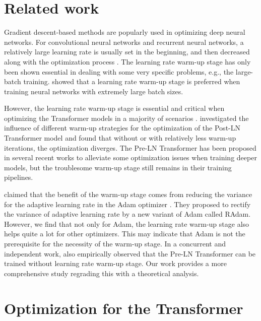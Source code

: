 \documentclass{article}
\begin{document}
\section{Related work}
Gradient descent-based methods \citep{kingma2014adam, zeiler2012adadelta, duchi2011adaptive,tieleman2012lecture} are popularly used in optimizing deep neural networks. For convolutional neural networks and recurrent neural networks, a relatively large learning rate is usually set in the beginning, and then decreased along with the optimization process \citep{he2016deep,he2017mask, sutskever2014sequence,gehring2017convolutional,he2019bag}. The learning rate warm-up stage has only been shown essential in dealing with some very specific problems, e.g., the large-batch training. \citet{goyal2017accurate,he2019bag,you2018imagenet} showed that a learning rate warm-up stage is preferred when training neural networks with extremely large batch sizes.

However, the learning rate warm-up stage is essential and critical when optimizing the Transformer models in a majority of scenarios \citep{vaswani2017attention, devlin2018bert, dai2019transformer, radford2019language, lu2019understanding}. \citet{popel2018training} investigated the influence of different warm-up strategies for the optimization of the Post-LN Transformer model and found that without or with relatively less warm-up iterations, the optimization diverges. The Pre-LN Transformer has been proposed in several recent works \citep{baevski2018adaptive,child2019generating,wang2019learning} to alleviate some optimization issues when training deeper models, but the troublesome warm-up stage still remains in their training pipelines. 

\citep{liu2019variance} claimed that the benefit of the warm-up stage comes from reducing the variance for the adaptive learning rate in the Adam optimizer \citep{kingma2014adam}. They proposed to rectify the variance of adaptive learning rate by a new variant of Adam called RAdam. However, we find that not only for Adam, the learning rate warm-up stage also helps quite a lot for other optimizers. This may indicate that Adam is not the prerequisite for the necessity of the warm-up stage. In a concurrent and independent work, \citet{nguyen2019transformers} also empirically observed that the Pre-LN Transformer can be trained without learning rate warm-up stage. Our work provides a more comprehensive study regrading this with a theoretical analysis. 

\section{Optimization for the Transformer}
\end{document}
